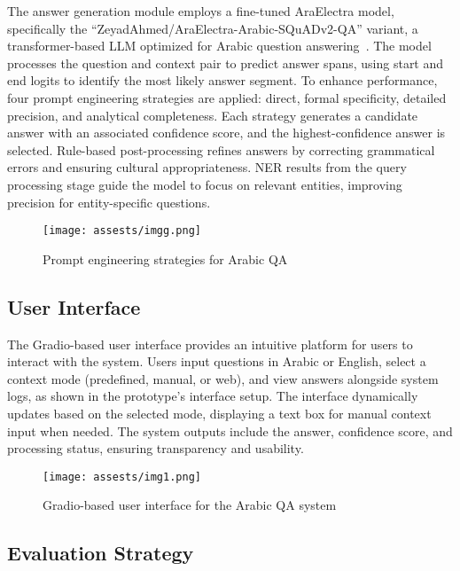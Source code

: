 \documentclass[conference]{IEEEtran}
\begin{document}
The answer generation module employs a fine-tuned AraElectra model, specifically the ``ZeyadAhmed/AraElectra-Arabic-SQuADv2-QA'' variant, a transformer-based LLM optimized for Arabic question answering~\cite{b7}. The model processes the question and context pair to predict answer spans, using start and end logits to identify the most likely answer segment. To enhance performance, four prompt engineering strategies are applied: direct, formal specificity, detailed precision, and analytical completeness. Each strategy generates a candidate answer with an associated confidence score, and the highest-confidence answer is selected. Rule-based post-processing refines answers by correcting grammatical errors and ensuring cultural appropriateness. NER results from the query processing stage guide the model to focus on relevant entities, improving precision for entity-specific questions.

\begin{figure}[H]
  \centering
  \texttt{[image: assests/imgg.png]}
  \caption{Prompt engineering strategies for Arabic QA}
  \label{fig:Prompt engineering strategies for Arabic QA}
  \end{figure}

\subsection{User Interface}

The Gradio-based user interface provides an intuitive platform for users to interact with the system. Users input questions in Arabic or English, select a context mode (predefined, manual, or web), and view answers alongside system logs, as shown in the prototype’s interface setup. The interface dynamically updates based on the selected mode, displaying a text box for manual context input when needed. The system outputs include the answer, confidence score, and processing status, ensuring transparency and usability.

\begin{figure}[H]
  \centering
  \texttt{[image: assests/img1.png]}
  \caption{Gradio-based user interface for the Arabic QA system}
  \label{fig:interface}
\end{figure}


\subsection{Evaluation Strategy}
\end{document}
